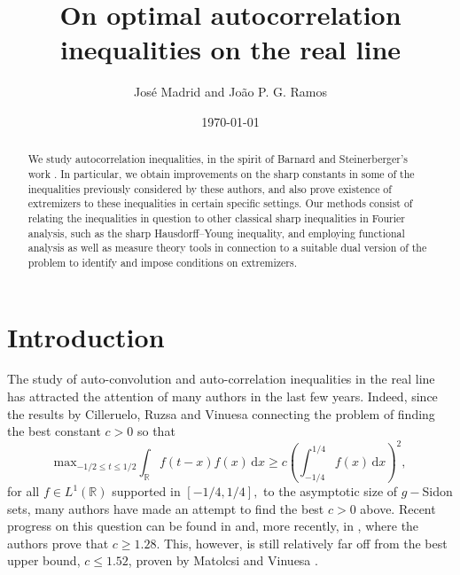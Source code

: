 \documentclass[11pt, reqno]{amsart}
\newcommand{\mmd}{ \mathrm{d}}
\numberwithin{equation}{section}
\newcommand{\R}{{\mathbb R}}
\begin{document}
\title{On optimal autocorrelation inequalities on the real line}
\author{Jos{\'e} Madrid and Jo\~ao P. G. Ramos}

\date{\today}
\keywords{}


	
\address{José Madrid: Department of  Mathematics,  University  of  California,  Los  Angeles (UCLA),  Portola Plaza 520, Los  Angeles,
California, 90095, USA}

\address{Jo\~ao P.G. Ramos: Instituto Nacional de Matem\'atica Pura e Aplicada (IMPA), Estrada Dona Castorina 110, Rio de Janeiro, RJ, 22460-320, Brazil}
	
	




\maketitle
\begin{abstract}
We study %
autocorrelation inequalities, in the spirit of Barnard and Steinerberger's work \cite{BarnardSteinerberger}. In particular, we obtain improvements on the sharp constants in some of the inequalities previously considered by these authors, and also 
prove existence of extremizers to these inequalities in certain specific settings. Our methods consist of relating the inequalities in question to other classical sharp inequalities in Fourier analysis, such as the sharp Hausdorff--Young inequality, and employing functional analysis as well as 
measure theory tools in connection to a suitable dual version of the problem to identify and impose conditions on extremizers. 
\end{abstract}



\section{Introduction}
The study of auto-convolution and auto-correlation inequalities in the real line has attracted the attention of many authors in the last few years. Indeed, since the results by Cilleruelo, Ruzsa and Vinuesa \cite{CRV} connecting the problem of finding the best constant $c>0$ so that 
\[
\text{max}_{-1/2 \le t \le 1/2} \int_{\R} f(t-x)f(x) \, \mmd x \ge c \left(\int_{-1/4}^{1/4} f(x) \, \mmd x\right)^2,
\]
for all $f \in L^1(\R)$ supported in $[-1/4,1/4],$ to the asymptotic size of $g-$Sidon sets, many authors have made an attempt to find the best $c>0$ above. Recent progress on this question can be found in \cite{CRT,G,MOB1,Y,MOB2,MV} and, more recently, in \cite{CS}, where the authors prove that $c \ge 1.28.$ This, however, is still relatively far off 
from the best upper bound, $c \le 1.52$, proven by Matolcsi and Vinuesa \cite{MV}. 
\end{document}
